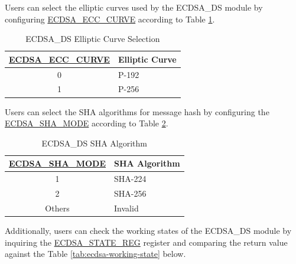 \documentclass[main\_\_EN.tex]{subfiles}
\begin{document}
Users can select the elliptic curves used by the ECDSA\_DS module by configuring \hyperref[fielddesc:ECDSAECCCURVE]{ECDSA\_ECC\_CURVE} according to Table \ref{tab:ecdsa-curve-selection}.

\begin{table}[H]
    \centering
    \caption{ECDSA\_DS Elliptic Curve Selection}
    \label{tab:ecdsa-curve-selection}
    \begin{tabular}{ | c | l | }
    \hline
        \rowcolor{lightgray}
        \textbf{\hyperref[fielddesc:ECDSAECCCURVE]{ECDSA\_ECC\_CURVE}}      & \textbf{Elliptic Curve}\\
        \hline
        0                       & P-192    \\\hline
        1                       & P-256    \\\hline
    \end{tabular}
\end{table}

Users can select the SHA algorithms for message hash by configuring the \hyperref[fielddesc:ECDSASHAMODE]{ECDSA\_SHA\_MODE} according to Table \ref{tab:ecdsa-sha-algorithms}.

\begin{table}[H]
    \centering
    \caption{ECDSA\_DS SHA Algorithm}
    \label{tab:ecdsa-sha-algorithms}
    \begin{tabular}{ | c | l | }
    \hline
        \rowcolor{lightgray}
        \textbf{\hyperref[fielddesc:ECDSASHAMODE]{ECDSA\_SHA\_MODE}}      & \textbf{SHA Algorithm}\\
        \hline
        1                       & SHA-224    \\\hline
        2                       & SHA-256    \\\hline
        Others                  & Invalid    \\\hline
    \end{tabular}
\end{table}

Additionally, users can check the working states of the ECDSA\_DS module by inquiring the \hyperref[regdesc:ECDSASTATEREG]{ECDSA\_STATE\_REG} register and comparing the return value against the Table \ref{tab:ecdsa-working-state} below.
\end{document}
